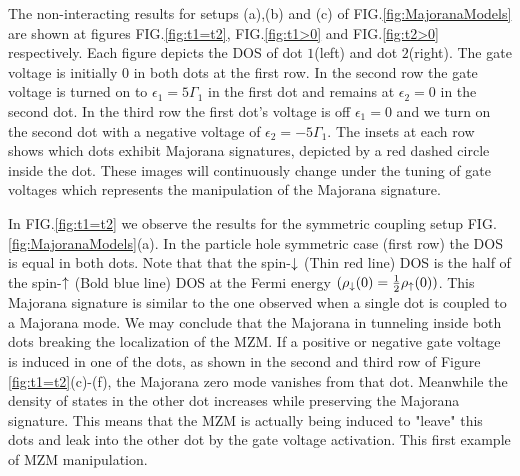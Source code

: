 \documentclass[showpacs,aps,prb,reprint,superscriptaddress]{revtex4-1}
\begin{document}
 	 The non-interacting results for setups (a),(b) and (c) of FIG.\ref{fig:MajoranaModels} are shown at figures FIG.\ref{fig:t1=t2}, FIG.\ref{fig:t1>0} and FIG.\ref{fig:t2>0} respectively. Each figure depicts the DOS of dot $1$(left) and dot $2$(right). The gate voltage is initially $0$ in both dots at the first row. In the second row the gate voltage is turned on to  $\epsilon_1 = 5\Gamma_1$ in the first dot and remains at $\epsilon_2 = 0$ in the second dot. In the third row the first dot's voltage is off $\epsilon_1=0$ and we turn on the second dot with a negative voltage of $\epsilon_2 = -5\Gamma_1$. The insets at each row shows which dots exhibit Majorana signatures, depicted by a red dashed circle inside the dot. These images will continuously change under the tuning of gate voltages which represents the manipulation of the Majorana signature.
     
     

     


     In FIG.\ref{fig:t1=t2} we observe the results for the symmetric coupling setup FIG.\ref{fig:MajoranaModels}(a). In the particle hole symmetric case (first row) the DOS is equal in both dots. Note that that the spin-$\downarrow$ (Thin red line) DOS is the half of the spin-$\uparrow$ (Bold blue line) DOS at the Fermi energy $(\rho_\downarrow(0) = \frac{1}{2}\rho_\uparrow(0))$. This Majorana signature is similar to the one observed when a single dot is coupled to a Majorana mode. \cite{liu_detecting_2011} We may conclude that the Majorana in tunneling inside both dots breaking the localization of the MZM. If a positive or negative gate voltage is induced in one of the dots, as shown in the second and third row of Figure \ref{fig:t1=t2}(c)-(f),  the Majorana zero mode vanishes from that dot. Meanwhile the density of states in the other dot increases while preserving the Majorana signature. This means that the MZM is actually being induced to "leave" this dots and leak into the other dot by the gate voltage activation. This first example of MZM manipulation. 
\end{document}
